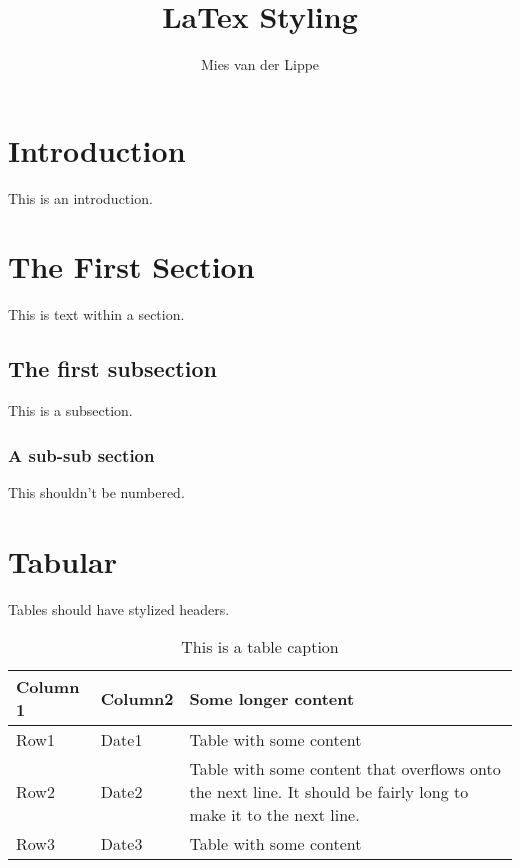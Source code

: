\documentclass{report}
\author{Mies van der Lippe}
\title{LaTex Styling}
\begin{document}
	
	\tableofcontents
	\newpage
	\section{Introduction}
	This is an introduction. 
	
	\newpage
	
	\section{The First Section}
	This is text within a section. 
	
	\subsection{The first subsection}
	This is a subsection.
	
	\subsubsection{A sub-sub section}
	This shouldn't be numbered. 
	
	\section{Tabular}
	Tables should have stylized headers. 
	
	\begin{table}[!h]
		\begin{tabular}{|p{2cm}|p{2.5cm}|p{11cm}|} \hline
			Column 1	& Column2	& Some longer content\\\hline
			Row1	& Date1	& Table with some content\\\hline	
			Row2	& Date2	& Table with some content that overflows onto the next line. It should be fairly long to make it to the next line.\\\hline	
			Row3	& Date3	& Table with some content\\\hline	
		\end{tabular}
		\caption{This is a table caption}
	\end{table} 
	
	\listoffigures
	\listoftables
	
	
\end{document}
